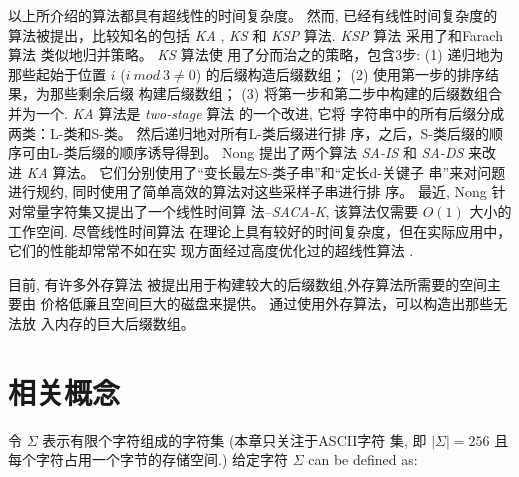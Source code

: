\documentclass{ws-ijprai}
\begin{document}
以上所介绍的算法都具有超线性的时间复杂度。 然而, 已经有线性时间复杂度的
算法被提出，比较知名的包括 \emph{KA} \cite{Ko2005}, \emph{KS}
\cite{Karkkainen2006} 和 \emph{KSP}\cite{Kim2005} 算法. \emph{KSP} 算法
采用了和Farach算法 \cite{Farach1997} 类似地归并策略。 \emph{KS} 算法使
用了分而治之的策略，包含3步: (1) 递归地为那些起始于位置 $i$ ($i~mod~3
\neq 0$) 的后缀构造后缀数组； (2) 使用第一步的排序结果，为那些剩余后缀
构建后缀数组； (3) 将第一步和第二步中构建的后缀数组合并为一个.
\emph{KA} 算法是 \emph{two-stage} 算法\cite{Itoh1999} 的一个改进, 它将
字符串中的所有后缀分成两类：L-类和S-类。 然后递归地对所有L-类后缀进行排
序，之后，S-类后缀的顺序可由L-类后缀的顺序诱导得到。 Nong
\cite{Nong2011}提出了两个算法 \emph{SA-IS} 和 \emph{SA-DS} 来改
进 \emph{KA} 算法。 它们分别使用了“变长最左S-类子串”和“定长d-关键子
串”来对问题进行规约, 同时使用了简单高效的算法对这些采样子串进行排
序。 最近, Nong\cite{Nong2013} 针对常量字符集又提出了一个线性时间算
法--\emph{SACA-K}, 该算法仅需要 $O(1)$ 大小的工作空间. 尽管线性时间算法
在理论上具有较好的时间复杂度，但在实际应用中， 它们的性能却常常不如在实
现方面经过高度优化过的超线性算法 \cite{Rajasekaran2014}.

目前, 有许多外存算法\cite{Karkkainen2014} \cite{Nong2014}
\cite{Nong2015} 被提出用于构建较大的后缀数组,外存算法所需要的空间主要由
价格低廉且空间巨大的磁盘来提供。 通过使用外存算法，可以构造出那些无法放
入内存的巨大后缀数组。

\section{相关概念}
\label{sec:stucture}

令 $\Sigma$ 表示有限个字符组成的字符集 (本章只关注于ASCII字符
集, 即 $|\Sigma| = 256$ 且每个字符占用一个字节的存储空间.)  给定字符
$\Sigma$ can be defined as:\\
\end{document}
